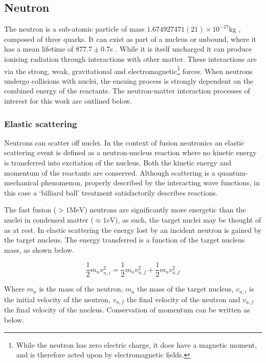 \subsection{Neutron}
The neutron is a sub-atomic particle of mass $1.674927471(21)\times10^{-27}$kg \cite{NIST2018}, composed of three quarks. It can exist as part of a nucleus or unbound, where it has a mean lifetime of $877.7 \pm 0.7$s \cite{Pattie2018}. While it is itself uncharged it can produce ionising radiation through interactions with other matter. These interactions are via the strong, weak, gravitational and electromagnetic\footnote{While the neutron has zero electric charge, it does have a magnetic moment, and is therefore acted upon by electromagnetic fields.} forces. When neutrons undergo collisions with nuclei, the ensuing process is strongly dependent on the combined energy of the reactants. The neutron-matter interaction processes of interest for this work are outlined below.

\subsubsection{Elastic scattering}
\label{subsubsec:elastic}
Neutrons can scatter off nuclei. In the context of fusion neutronics an elastic scattering event is defined as a neutron-nucleus reaction where no kinetic energy is transferred into excitation of the nucleus. Both the kinetic energy and momentum of the reactants are conserved. Although scattering is a quantum-mechanical phenomenon, properly described by the interacting wave functions, in this case a `billiard ball' treatment satisfactorily describes reactions. 

The fast fusion ($> 1 \mathrm{MeV}$) neutrons are significantly more energetic than the nuclei in condensed matter ($\approx 1 \mathrm{eV}$), as such, the target nuclei may be thought of as at rest. In elastic scattering the energy lost by an incident neutron is gained by the target nucleus. The energy transferred is a function of the target nucleus mass, as shown below.

\begin{equation}
  \frac{1}{2}m_{n}v_{n,i}^{2} = \frac{1}{2}m_{n}v_{n,f}^{2} + \frac{1}{2}m_{a}v_{a,f}^{2}
  \label{eq:conserve_energy}
\end{equation}

Where $m_{n}$ is the mass of the neutron, $m_{a}$ the mass of the target nucleus, $v_{n,i}$ is the initial velocity of the neutron, $v_{n,f}$ the final velocity of the neutron and $v_{a,f}$ the final velocity of the nucleus. Conservation of momentum can be written as below.

